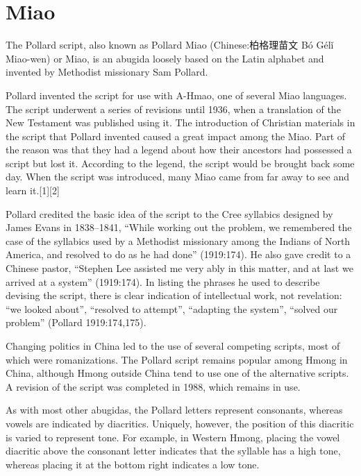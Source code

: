 \newfontfamily{}
\section{Miao}
\label{s:miao}

The Pollard script, also known as Pollard Miao (Chinese:{\pan 柏格理苗文 Bó Gélǐ} Miao-wen) or Miao, is an abugida loosely based on the Latin alphabet and invented by Methodist missionary Sam Pollard. 

Pollard invented the script for use with A-Hmao, one of several Miao languages. The script underwent a series of revisions until 1936, when a translation of the New Testament was published using it. The introduction of Christian materials in the script that Pollard invented caused a great impact among the Miao. Part of the reason was that they had a legend about how their ancestors had possessed a script but lost it. According to the legend, the script would be brought back some day. When the script was introduced, many Miao came from far away to see and learn it.[1][2]

Pollard credited the basic idea of the script to the Cree syllabics designed by James Evans in 1838–1841, “While working out the problem, we remembered the case of the syllabics used by a Methodist missionary among the Indians of North America, and resolved to do as he had done” (1919:174). He also gave credit to a Chinese pastor, “Stephen Lee assisted me very ably in this matter, and at last we arrived at a system” (1919:174). In listing the phrases he used to describe devising the script, there is clear indication of intellectual work, not revelation: “we looked about”, “resolved to attempt”, “adapting the system”, “solved our problem” (Pollard 1919:174,175).

Changing politics in China led to the use of several competing scripts, most of which were romanizations. The Pollard script remains popular among Hmong in China, although Hmong outside China tend to use one of the alternative scripts. A revision of the script was completed in 1988, which remains in use.

As with most other abugidas, the Pollard letters represent consonants, whereas vowels are indicated by diacritics. Uniquely, however, the position of this diacritic is varied to represent tone. For example, in Western Hmong, placing the vowel diacritic above the consonant letter indicates that the syllable has a high tone, whereas placing it at the bottom right indicates a low tone.

